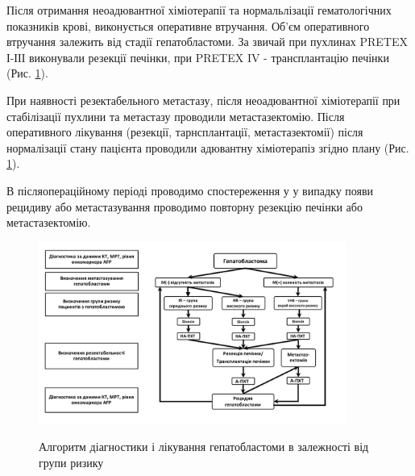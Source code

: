 Після отримання неоадювантної хіміотерапії та нормальлізації гематологічних показників крові, виконується оперативне втручання. Об'єм оперативного втручання залежить від стадії гепатобластоми. За звичай при пухлинах PRETEX І-ІІІ виконували резекції печінки, при PRETEX IV - трансплантацію печінки (Рис. \ref{fig:algoritmmm}).

При наявності резектабельного метастазу, після неоадювантної хіміотерапії при стабілізації пухлини та метастазу проводили метастазектомію. Після оперативного лікування (резекції, тарнсплантації, метастазектомії) після нормалізації стану пацієнта проводили адювантну хіміотерапіз згідно плану (Рис. \ref{fig:algoritmmm}).

В післяопераційному періоді проводимо спостереження у у випадку появи рецидиву або метастазування проводимо повторну резекцію печінки або метастазектомію. 

\begin{figure}[h]
\caption{Алгоритм діагностики і лікування гепатобластоми в залежності від групи ризику}
\centering
\includegraphics[width=0.9\textwidth]{Illustrations/algoritmmm.jpg}
\label{fig:algoritmmm} 
\end{figure}